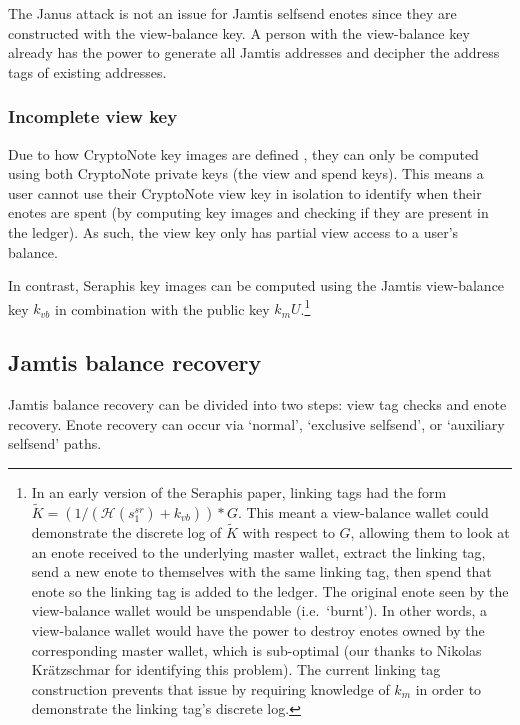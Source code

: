 The Janus attack is not an issue for Jamtis selfsend enotes since they are constructed with the view-balance key. A person with the view-balance key already has the power to generate all Jamtis addresses and decipher the address tags of existing addresses.

\subsubsection{Incomplete view key}
\label{subsubsec:jamtis-cryptonote-flaws-view-key}

Due to how CryptoNote key images are defined \cite{cryptoNoteWhitePaper}, they can only be computed using both CryptoNote private keys (the view and spend keys). This means a user cannot use their CryptoNote view key in isolation to identify when their enotes are spent (by computing key images and checking if they are present in the ledger). As such, the view key only has partial view access to a user's balance.

In contrast, Seraphis key images can be computed using the Jamtis view-balance key $k_{vb}$ in combination with the public key $k_m U$.\footnote{In an early version of the Seraphis paper, linking tags had the form $\tilde{K} = (1/(\mathcal{H}(s^{sr}_1) + k_{vb}))*G$. This meant a view-balance wallet could demonstrate the discrete log of $\tilde{K}$ with respect to $G$, allowing them to look at an enote received to the underlying master wallet, extract the linking tag, send a new enote to themselves with the same linking tag, then spend that enote so the linking tag is added to the ledger. The original enote seen by the view-balance wallet would be unspendable (i.e.\ `burnt'). In other words, a view-balance wallet would have the power to destroy enotes owned by the corresponding master wallet, which is sub-optimal (our thanks to Nikolas Kr{\"{a}}tzschmar for identifying this problem). The current linking tag construction prevents that issue by requiring knowledge of $k_m$ in order to demonstrate the linking tag's discrete log.}


\subsection{Jamtis balance recovery}
\label{subsec:jamtis-balance-recovery}

Jamtis balance recovery can be divided into two steps: view tag checks and enote recovery. Enote recovery can occur via `normal', `exclusive selfsend', or `auxiliary selfsend' paths.

